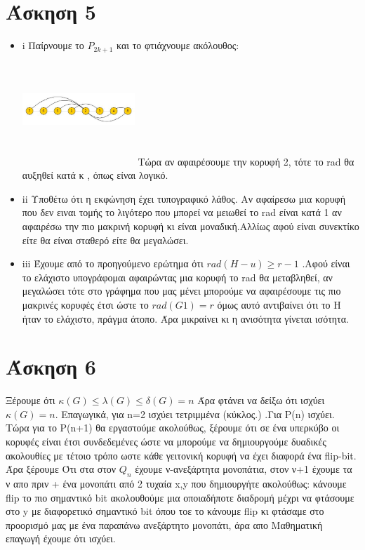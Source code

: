 \documentclass{article}
\begin{document}
    \section*{Άσκηση 5}
    \begin{itemize}
    	\item i 
    	Παίρνουμε το $P_{2k+1}$ και το φτιάχνουμε ακόλουθος:\\
    	\includegraphics[width=120pt,height=120pt]{ex51} 
    	Τώρα αν αφαιρέσουμε την κορυφή 2, τότε το rad θα αυξηθεί κατά κ , όπως είναι λογικό.
    	\item ii
    	Υποθέτω ότι η εκφώνηση έχει τυπογραφικό λάθος.
    	Αν αφαίρεσω μια κορυφή που δεν ειναι τομής το λιγότερο που μπορεί να μειωθεί το rad είναι κατά 1 αν αφαιρέσω την πιο μακρινή κορυφή κι είναι μοναδική.Αλλίως αφού είναι συνεκτίκο είτε θα είναι σταθερό είτε θα μεγαλώσει. 
    	\item iii
    	Έχουμε από το προηγούμενο ερώτημα ότι $rad(H-u) \ge r-1$ .Αφού είναι το ελάχιστο υπογράφομαι αφαιρώντας μια κορυφή το rad θα μεταβληθεί, αν μεγαλώσει τότε στο γράφημα που μας μένει μπορούμε να αφαιρέσουμε τις πιο μακρινές κορυφές έτσι ώστε το $rad(G1)=r$ όμως αυτό αντιβαίνει ότι το H ήταν το ελάχιστο, πράγμα άτοπο. Άρα μικραίνει κι η ανισότητα γίνεται ισότητα.
    \end{itemize}
      \section*{Άσκηση 6}
      Ξέρουμε ότι $\kappa(G)\le \lambda(G) \le \delta(G)= n$
      Άρα φτάνει να δείξω ότι ισχύει $\kappa(G) =n$. Επαγωγικά, για n=2 ισχύει τετριμμένα (κύκλος.) .Για P(n) ισχύει. Τώρα για το P(n+1) θα εργαστούμε ακολούθως, ξέρουμε ότι σε ένα υπερκύβο οι κορυφές είναι έτσι συνδεδεμένες ώστε να μπορούμε να δημιουργούμε δυαδικές ακολουθίες με τέτοιο τρόπο ωστε κάθε γειτονική κορυφή να έχει διαφορά ένα flip-bit. Άρα ξέρουμε Ότι στα στον $Q_n$ έχουμε ν-ανεξάρτητα μονοπάτια, στον ν+1 έχουμε τα ν απο πριν + ένα μονοπάτι από 2 τυχαία x,y που δημιουργήτε ακολούθως: κάνουμε flip το πιο σημαντικό bit ακολουθούμε μια οποιαδήποτε διαδρομή μέχρι να φτάσουμε στο y με διαφορετικό σημαντικό bit όπου τοε το κάνουμε flip κι φτάσαμε στο προορισμό μας με ένα παραπάνω ανεξάρτητο μονοπάτι, άρα απο Μαθηματική επαγωγή έχουμε ότι ισχύει.
\end{document}
